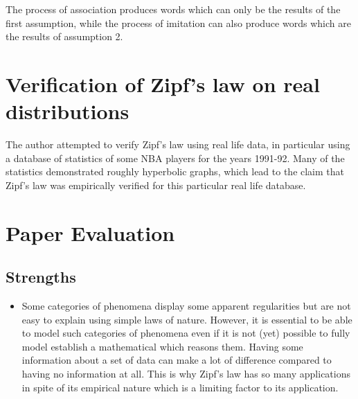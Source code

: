 \documentclass{article} \usepackage{hyperref} \usepackage{graphicx}
\begin{document}
The process of association produces words which can only be the results of
the first assumption, while the process of imitation can also produce words
which are the results of assumption 2.

\section{Verification of Zipf's law on real distributions}

The author attempted to verify Zipf's law using real life data, in
particular using a database of statistics of some NBA players for the years
1991-92. Many of the statistics demonstrated roughly hyperbolic graphs,
which lead to the claim that Zipf's law was empirically verified for this
particular real life database.

\section{Paper Evaluation}
\subsection{Strengths}
\begin{itemize}
\item Some categories of phenomena display some apparent regularities but
  are not easy to explain using simple laws of nature. However, it is
  essential to be able to model such categories of phenomena even if it is
  not (yet) possible to fully model establish a mathematical which reasons
  them. Having some information about a set of data can make a lot of
  difference compared to having no information at all. This is why Zipf's
  law has so many applications in spite of its empirical nature which is a
  limiting factor to its application.
\end{itemize}
\end{document}
